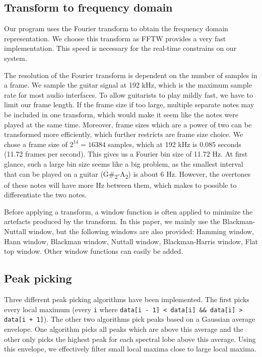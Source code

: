\documentclass[10pt,twocolumn]{article}
\begin{document}
\subsection{Transform to frequency domain}  \label{sub:four}
Our program uses the Fourier transform to obtain the frequency domain representation. We choose this transform as FFTW provides a very fast implementation. This speed is necessary for the real-time constrains on our system.

The resolution of the Fourier transform is dependent on the number of samples in a frame. We sample the guitar signal at 192 kHz, which is the maximum sample rate for most audio interfaces. To allow guitarists to play mildly fast, we have to limit our frame length. If the frame size if too large, multiple separate notes may be included in one transform, which would make it seem like the notes were played at the same time. Moreover, frame sizes which are a power of two can be transformed more efficiently, which further restricts are frame size choice. We chose a frame size of $2^{14} = 16384$ samples, which at 192 kHz is 0.085 seconds (11.72 frames per second). This gives us a Fourier bin size of 11.72 Hz. At first glance, such a large bin size seems like a big problem, as the smallest interval that can be played on a guitar (G\#\textsubscript{2}-A\textsubscript{2}) is about 6 Hz. However, the overtones of these notes will have more Hz between them, which makes to possible to differentiate the two notes.%

Before applying a transform, a window function is often applied to minimize the artefacts produced by the transform. In this paper, we mainly use the Blackman-Nuttall window, but the following windows are also provided: Hamming window, Hann window, Blackman window, Nuttall window, Blackman-Harris window, Flat top window. Other window functions can easily be added.

\subsection{Peak picking} \label{sub:peak}
Three different peak picking algorithms have been implemented. The first picks every local maximum (every \texttt{i} where \texttt{data[i - 1] < data[i] \&\& data[i] > data[i + 1]}). The other two algorithms pick peaks based on a Gaussian average envelope. One algorithm picks all peaks which are above this average and the other only picks the highest peak for each spectral lobe above this average. Using this envelope, we effectively filter small local maxima close to large local maxima.
\end{document}
